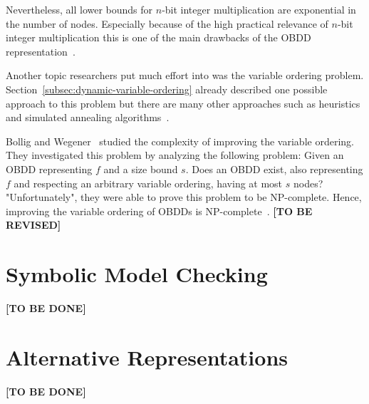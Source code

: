 \documentclass{vldb}
\newcommand{\tbr}{\textbf{[TO BE REVISED]}}
\newcommand{\tbd}{\textbf{[TO BE DONE]}}
\begin{document}
Nevertheless, all lower bounds for $n$-bit integer multiplication are exponential
in the number of nodes. Especially because of the high practical relevance of
$n$-bit integer multiplication this is one of the main drawbacks of the OBDD
representation~\cite{BRYANT86, BRYANT91, WOELFEL01}.

Another topic researchers put much effort into was the variable ordering problem.
Section~\ref{subsec:dynamic-variable-ordering} already described one possible
approach to this problem but there are many other approaches such as heuristics
and simulated annealing algorithms~\cite{BOLLIG96}.

Bollig and Wegener~\cite{BOLLIG96} studied the complexity of improving the
variable ordering. They investigated this problem by analyzing the following
problem: Given an OBDD representing $f$ and a size bound $s$. Does an OBDD exist,
also representing $f$ and respecting an arbitrary variable ordering, having at
most $s$ nodes? "Unfortunately", they were able to prove this problem to be 
NP-complete. Hence, improving the variable ordering of OBDDs is
NP-complete~\cite{BOLLIG96}. \tbr

\section{Symbolic Model Checking}
\label{sec:symbolic-model-checking}

\tbd

\section{Alternative Representations}
\label{sec:alternative-representations}

\tbd

\balance



\end{document}
